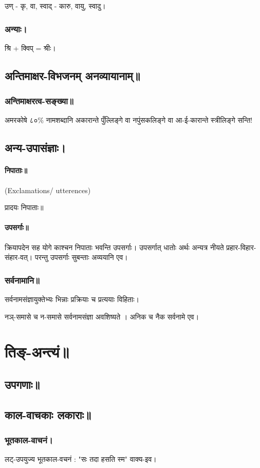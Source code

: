 \documentclass[oneside, article]{memoir}
\begin{document}
उण् - कृ, वा, स्वाद् - कारु, वायु, स्वादु।

\subsection{अन्याः।}
श्रि + क्विप् = श्रीः।

\section{अन्तिमाक्षर-विभजनम् अनव्यायानाम्॥}
\subsection{अन्तिमाक्षरत्व-सङ्ख्या॥}
अमरकोषे ८०\% नामशब्दानि अकारान्ते पुँल्लिङ्गे वा नपुंसकलिङ्गे वा आ-ई-कारान्ते स्त्रीलिङ्गे सन्ति!

\section{अन्य-उपासंज्ञाः।}
\subsubsection{निपाताः॥}
(Exclamations/ utterences)

प्रादयः निपाताः॥

\subsubsection{उपसर्गाः॥}
क्रियापदेन सह योगे काश्चन निपाताः भवन्ति उपसर्गाः। उपसर्गात् धातोः अर्थः अन्यत्र नीयते प्रहार-विहार-संहार-वत्। परन्तु उपसर्गाः सुबन्ताः अव्ययानि एव।

\subsection{सर्वनामानि॥}
सर्वनामसंज्ञायुक्तेभ्यः भिन्नाः प्रक्रियाः च प्रत्ययाः विहिताः।

नञ्-समासे च न-समासे सर्वनामसंज्ञा अवशिष्यते । अनिक च नैक सर्वनामे एव।



\chapter{तिङ्-अन्त्यं॥}
\section{उपगणाः॥}
\section{काल-वाचकाः लकाराः॥}
\subsection{भूतकाल-वाचनं।}
लट्-उपयुज्य भूतकाल-वचनं : "सः तदा हसति स्म" वाक्य-इव। 
\end{document}
